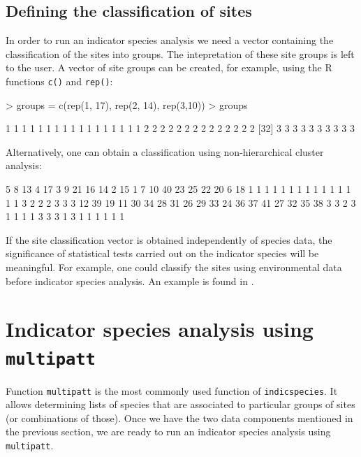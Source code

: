 \documentclass[11pt,a4paper]{article}
\begin{document}
\subsection{Defining the classification of sites}
In order to run an indicator species analysis we need a vector containing the classification of the sites into groups. The intepretation of these site groups is left to the user. A vector of site groups can be created, for example, using the R functions \texttt{c()} and \texttt{rep()}:
\begin{Schunk}
\begin{Sinput}
> groups = c(rep(1, 17), rep(2, 14), rep(3,10))
> groups
\end{Sinput}
\begin{Soutput}
 [1] 1 1 1 1 1 1 1 1 1 1 1 1 1 1 1 1 1 2 2 2 2 2 2 2 2 2 2 2 2 2 2
[32] 3 3 3 3 3 3 3 3 3 3
\end{Soutput}
\end{Schunk}
Alternatively, one can obtain a classification using non-hierarchical cluster analysis:
\begin{Schunk}
\begin{Soutput}
 5  8 13  4 17  3  9 21 16 14  2 15  1  7 10 40 23 25 22 20  6 18 
 1  1  1  1  1  1  1  1  1  1  1  1  1  1  1  3  2  2  2  3  3  3 
12 39 19 11 30 34 28 31 26 29 33 24 36 37 41 27 32 35 38 
 3  3  2  3  1  1  1  1  3  3  3  1  3  1  1  1  1  1  1 
\end{Soutput}
\end{Schunk}

If the site classification vector is obtained independently of species data, the significance of statistical tests carried out on the indicator species will be meaningful. For example, one could classify the sites using environmental data before indicator species analysis. An example is found in \citet{Borcard2011}.

\section{Indicator species analysis using \texttt{multipatt}}
Function \texttt{multipatt} is the most commonly used function of \texttt{indicspecies}. It allows determining lists of species that are associated to particular groups of sites (or combinations of those). Once we have the two data components mentioned in the previous section, we are ready to run an indicator species analysis using \texttt{multipatt}.
\end{document}
